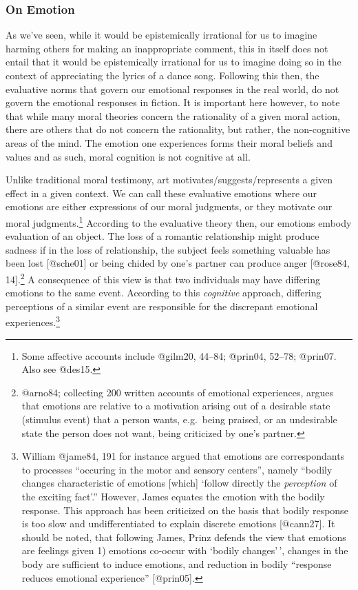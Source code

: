 \documentclass[
  letterpaper,
  DIV=11,
  numbers=noendperiod]{scrartcl}
\theoremstyle{remark}
\begin{document}
\subsubsection*{On Emotion}\label{on-emotion}

As we've seen, while it would be epistemically irrational for us to
imagine harming others for making an inappropriate comment, this in
itself does not entail that it would be epistemically irrational for us
to imagine doing so in the context of appreciating the lyrics of a dance
song. Following this then, the evaluative norms that govern our
emotional responses in the real world, do not govern the emotional
responses in fiction. It is important here however, to note that while
many moral theories concern the rationality of a given moral action,
there are others that do not concern the rationality, but rather, the
non-cognitive areas of the mind. The emotion one experiences forms their
moral beliefs and values and as such, moral cognition is not cognitive
at all.

Unlike traditional moral testimony, art motivates/suggests/represents a
given effect in a given context. We can call these evaluative emotions
where our emotions are either expressions of our moral judgments, or
they motivate our moral judgments.\footnote{Some affective accounts
  include @gilm20, 44--84; @prin04, 52--78; @prin07. Also see @des15.}
According to the evaluative theory then, our emotions embody evaluation
of an object. The loss of a romantic relationship might produce sadness
if in the loss of relationship, the subject feels something valuable has
been lost {[}@sche01{]} or being chided by one's partner can produce
anger {[}@rose84, 14{]}.\footnote{@arno84; collecting 200 written
  accounts of emotional experiences, argues that emotions are relative
  to a motivation arising out of a desirable state (stimulus event) that
  a person wants, e.g.~being praised, or an undesirable state the person
  does not want, being criticized by one's partner.} A consequence of
this view is that two individuals may have differing emotions to the
same event. According to this \emph{cognitive} approach, differing
perceptions of a similar event are responsible for the discrepant
emotional experiences.\footnote{William @jame84, 191 for instance argued
  that emotions are correspondants to processes ``occuring in the motor
  and sensory centers'', namely ``bodily changes characteristic of
  emotions {[}which{]} `follow directly the \emph{perception} of the
  exciting fact'.'' However, James equates the emotion with the bodily
  response. This approach has been criticized on the basis that bodily
  response is too slow and undifferentiated to explain discrete emotions
  {[}@cann27{]}. It should be noted, that following James, Prinz defends
  the view that emotions are feelings given 1) emotions co-occur with
  `bodily changes'\,', changes in the body are sufficient to induce
  emotions, and reduction in bodily ``response reduces emotional
  experience'' {[}@prin05{]}.}
\end{document}
